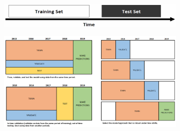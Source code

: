 \begin{figure}[H]
  \centering
  \begin{subfigure}{0.5\textwidth}
    \centering
    \includegraphics[width=\textwidth]{assets/sl/cross_val__out_of_time_concept.png}
  \end{subfigure}

  \vspace*{0.5cm}
  \begin{subfigure}{0.9\textwidth}
    \centering
    \includegraphics[width=\textwidth]{assets/sl/cross_val__out_of_time_model_models.png}
  \end{subfigure}


\end{figure}
